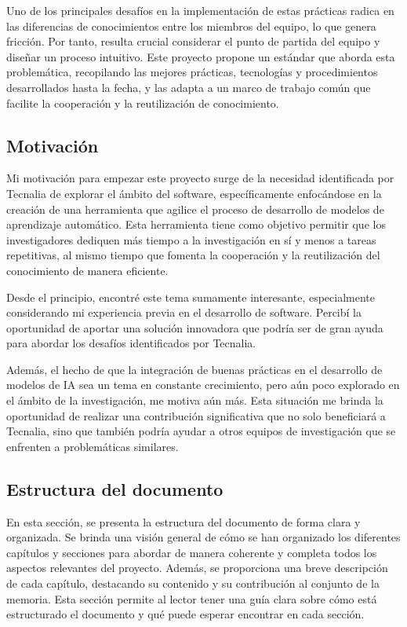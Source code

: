 Uno de los principales desafíos en la implementación de estas prácticas radica en las diferencias 
de conocimientos entre los miembros del equipo, lo que genera fricción. Por tanto, resulta crucial 
considerar el punto de partida del equipo y diseñar un proceso intuitivo. Este proyecto propone 
un estándar que aborda esta problemática, recopilando las mejores prácticas, tecnologías y 
procedimientos desarrollados hasta la fecha, y las adapta a un marco de trabajo común que
facilite la cooperación y la reutilización de conocimiento.

\subsection{Motivación}
Mi motivación para empezar este proyecto surge de la necesidad identificada por Tecnalia de 
explorar el ámbito del software, específicamente enfocándose en la creación de una herramienta 
que agilice el proceso de desarrollo de modelos de aprendizaje automático. Esta herramienta tiene 
como objetivo permitir que los investigadores dediquen más tiempo a la investigación en sí y 
menos a tareas repetitivas, al mismo tiempo que fomenta la cooperación y la reutilización del 
conocimiento de manera eficiente.\medskip

Desde el principio, encontré este tema sumamente interesante, especialmente considerando mi 
experiencia previa en el desarrollo de software. Percibí la oportunidad de aportar una 
solución innovadora que podría ser de gran ayuda para abordar los desafíos identificados por Tecnalia.\medskip

Además, el hecho de que la integración de buenas prácticas en el desarrollo de modelos de IA 
sea un tema en constante crecimiento, pero aún poco explorado en el ámbito de la investigación, 
me motiva aún más. Esta situación me brinda la oportunidad de realizar una contribución significativa 
que no solo beneficiará a Tecnalia, sino que también podría ayudar a otros equipos de investigación 
que se enfrenten a problemáticas similares.

\subsection{Estructura del documento}
En esta sección, se presenta la estructura del documento de forma clara y organizada. Se 
brinda una visión general de cómo se han organizado los diferentes capítulos y secciones 
para abordar de manera coherente y completa todos los aspectos relevantes del proyecto. 
Además, se proporciona una breve descripción de cada capítulo, destacando su contenido 
y su contribución al conjunto de la memoria. Esta sección permite al lector tener una 
guía clara sobre cómo está estructurado el documento y qué puede esperar encontrar en cada 
sección.

